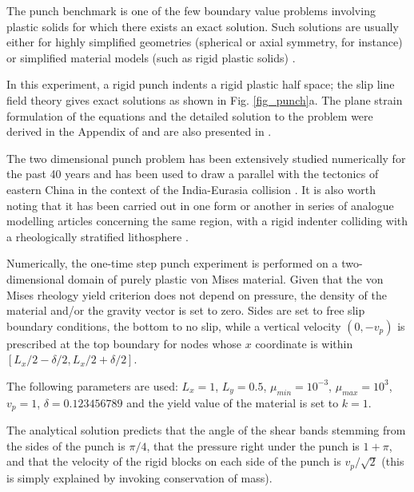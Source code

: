 
The punch benchmark is one of the few boundary value problems involving plastic solids for which there exists an exact solution. 
Such solutions are usually either for highly simplified geometries (spherical or axial symmetry, for instance) or simplified material models (such as rigid plastic solids) \cite{kacha04}.

In this experiment, a rigid punch indents a rigid plastic half space; the slip line field theory gives 
exact solutions as shown in Fig. \ref{fig_punch}a. 
The plane strain formulation of the equations and the detailed solution to the problem were derived in the Appendix of \cite{thfb08} and are also presented in \cite{gepd98}.

The two dimensional punch problem has been extensively studied numerically for the past 40 years 
\cite{zihl75,zihp95,chpe01,chan99,huhy99,yuti06,bufs08,raab07} and has been used to draw a parallel with the tectonics of eastern China in the context of the 
India-Eurasia collision \cite{tamo76,mota77}.
It is also worth noting that it has been carried out in one form or another in series of 
analogue modelling articles 
concerning the same region, with a rigid indenter colliding with a rheologically stratified lithosphere \cite{peta88,daco88,jodc90}.

 
Numerically, the one-time step punch experiment is performed on a two-dimensional
domain of purely plastic von Mises material. 
Given that the von Mises rheology yield criterion does not depend on pressure, the density of the material and/or the gravity vector is set to zero. Sides are set to free slip boundary conditions, the bottom to no slip, while a vertical velocity $(0,-v_p)$ is prescribed at the top boundary for nodes whose $x$ coordinate is within $[L_x/2-\delta/2,L_x/2+\delta/2]$. 

The following parameters are used: $L_x=1$, $L_y=0.5$, $\mu_{min}=10^{-3}$, 
$\mu_{max}=10^3$, $v_p=1$, $\delta=0.123456789$ 
and the yield value of the material is set to $k=1$. 

The analytical solution predicts that the angle of the shear bands stemming from the sides of the punch 
is $\pi/4$, that the pressure right under the punch is $1+\pi$, 
and that the velocity of the rigid blocks on each side of the punch is $v_p/\sqrt{2}$ 
(this is simply explained by invoking conservation of mass).

